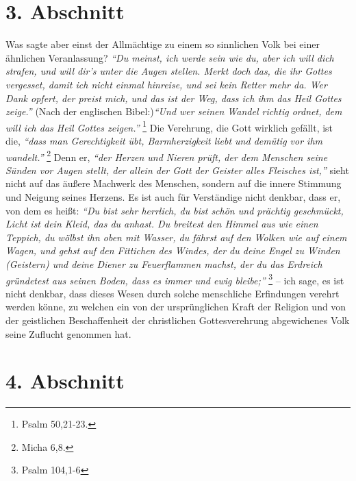 \section{3. Abschnitt} \label{kap5_ab3}


Was sagte aber einst der Allmächtige  zu einem so
sinnlichen Volk bei einer ähnlichen Veranlassung?
\textit{"`Du meinst, ich werde sein wie du, aber ich will dich
strafen, und will dir’s unter die Augen stellen. Merkt doch das, die ihr Gottes
vergesset, damit ich nicht einmal hinreise, und sei kein Retter mehr da. Wer
Dank opfert, der preist mich, und das ist der Weg, dass ich ihm das Heil
Gottes zeige."'} (Nach der englischen Bibel:)\textit{"`Und wer seinen Wandel richtig
ordnet, dem will ich das Heil Gottes zeigen."'}
\footnote{Psalm 50,21-23.}
Die Verehrung, die Gott wirklich gefällt, ist die, \label{Rechtfertigung} 
\textit{"`dass man Gerechtigkeit übt, Barmherzigkeit liebt und demütig vor ihm
wandelt."'}
\footnote{Micha 6,8.}
Denn er,
\textit{"`der  Herzen und Nieren prüft, der dem Menschen seine Sünden vor Augen
stellt, der allein der Gott der Geister alles Fleisches ist,"'} sieht nicht
auf das äußere Machwerk des Menschen, sondern auf die innere Stimmung und
Neigung seines Herzens. Es ist auch für Verständige nicht denkbar, dass er, von
dem es heißt:
\textit{"`Du bist sehr herrlich, du bist schön und prächtig geschmückt,
Licht ist dein Kleid, das du anhast. Du breitest den Himmel aus wie einen
Teppich, du wölbst ihn oben mit Wasser, du fährst auf den Wolken wie auf
einem Wagen, und gehst auf den Fittichen des Windes, der du deine Engel zu
Winden (Geistern) und deine Diener zu Feuerflammen machst, der du das Erdreich
gründetest aus seinen Boden, dass es immer und ewig bleibe;"'}
\footnote{Psalm 104,1-6}
-- ich sage, es ist nicht denkbar, dass dieses Wesen durch solche
menschliche Erfindungen verehrt werden könne, zu welchen ein von der
ursprünglichen Kraft der Religion und von der geistlichen Beschaffenheit der
christlichen Gottesverehrung abgewichenes Volk seine Zuflucht genommen hat.

\section{4. Abschnitt} \label{kap5_ab4}

